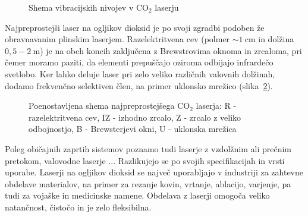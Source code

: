 \begin{figure}[h]
\centering
\def\svgwidth{95truemm} 

\caption{Shema vibracijskih nivojev v CO$_2$ laserju}
\label{fig:CO2E}
\end{figure}

Najpreprostejši laser na ogljikov dioksid  
je po svoji zgradbi podoben že obravnavanim plinskim laserjem. 
Razelektritvena cev (polmer $\sim 1~\si{\centi\metre}$ in dolžina $0,5-2~\si{\metre}$) 
je na obeh koncih zaključena z Brewstrovima oknoma in zrcaloma, pri čemer moramo paziti,
da elementi prepuščajo oziroma odbijajo infrardečo svetlobo. Ker lahko deluje
laser pri zelo veliko različnih valovnih dolžinah, dodamo frekvenčno selektiven
člen, na primer uklonsko mrežico (slika~\ref{fig:CO2S}).

\begin{figure}[h]
\centering
\def\svgwidth{100truemm} 

\caption{Poenostavljena shema najpreprostejšega CO$_2$ laserja: R - razelektritvena cev, 
IZ - izhodno zrcalo, Z - zrcalo z veliko odbojnostjo, B - Brewsterjevi okni, 
U - uklonska mrežica
}
\label{fig:CO2S}
\end{figure}

Poleg običajnih zaprtih sistemov poznamo tudi laserje z vzdolžnim ali prečnim pretokom, 
valovodne laserje ... Razlikujejo se po svojih specifikacijah in vrsti uporabe.
Laserji na ogljikov dioksid se največ uporabljajo v industriji za zahtevne 
obdelave materialov, na primer za rezanje 
kovin, vrtanje, ablacijo, varjenje, pa tudi za vojaške in medicinske namene.
Obdelava z laserji omogoča veliko natančnost, čistočo in je zelo fleksibilna.

